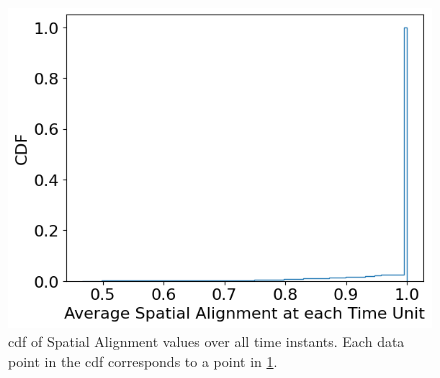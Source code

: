 \begin{figure}
\centering
\includegraphics[width=0.5\linewidth]{figures/mechanisms/spatial_ctx_mgmt/spatial_alignment_cdf.png}
\caption{\gls{cdf} of Spatial Alignment values over all time instants. Each data point in the \gls{cdf} corresponds to a point in \cref{fig:spatial_alignment_summary}.}
\label{fig:spatial_alignment_summary}
\end{figure}
